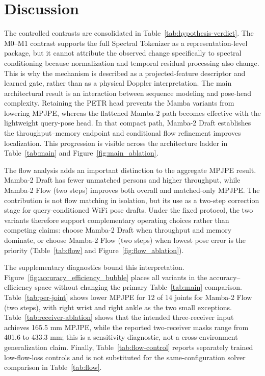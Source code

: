 \documentclass[conference,onecolumn]{IEEEtran}
\begin{document}
\section{Discussion}
The controlled contrasts are consolidated in Table~\ref{tab:hypothesis-verdict}. The M0--M1 contrast supports the full Spectral Tokenizer as a representation-level package, but it cannot attribute the observed change specifically to spectral conditioning because normalization and temporal residual processing also change. This is why the mechanism is described as a projected-feature descriptor and learned gate, rather than as a physical Doppler interpretation. The main architectural result is an interaction between sequence modeling and pose-head complexity. Retaining the PETR head prevents the Mamba variants from lowering MPJPE, whereas the flattened Mamba-2 path becomes effective with the lightweight query-pose head. In that compact path, Mamba-2 Draft establishes the throughput--memory endpoint and conditional flow refinement improves localization. This progression is visible across the architecture ladder in Table~\ref{tab:main} and Figure~\ref{fig:main_ablation}.

The flow analysis adds an important distinction to the aggregate MPJPE result. Mamba-2 Draft has fewer unmatched persons and higher throughput, while Mamba-2 Flow (two steps) improves both overall and matched-only MPJPE. The contribution is not flow matching in isolation, but its use as a two-step correction stage for query-conditioned WiFi pose drafts. Under the fixed protocol, the two variants therefore support complementary operating choices rather than competing claims: choose Mamba-2 Draft when throughput and memory dominate, or choose Mamba-2 Flow (two steps) when lowest pose error is the priority (Table~\ref{tab:flow} and Figure~\ref{fig:flow_ablation}).

The supplementary diagnostics bound this interpretation. Figure~\ref{fig:accuracy_efficiency_bubble} places all variants in the accuracy--efficiency space without changing the primary Table~\ref{tab:main} comparison. Table~\ref{tab:per-joint} shows lower MPJPE for 12 of 14 joints for Mamba-2 Flow (two steps), with right wrist and right ankle as the two small exceptions. Table~\ref{tab:receiver-ablation} shows that the intended three-receiver input achieves 165.5 mm MPJPE, while the reported two-receiver masks range from 401.6 to 433.3 mm; this is a sensitivity diagnostic, not a cross-environment generalization claim. Finally, Table~\ref{tab:flow-control} reports separately trained low-flow-loss controls and is not substituted for the same-configuration solver comparison in Table~\ref{tab:flow}.
\end{document}
